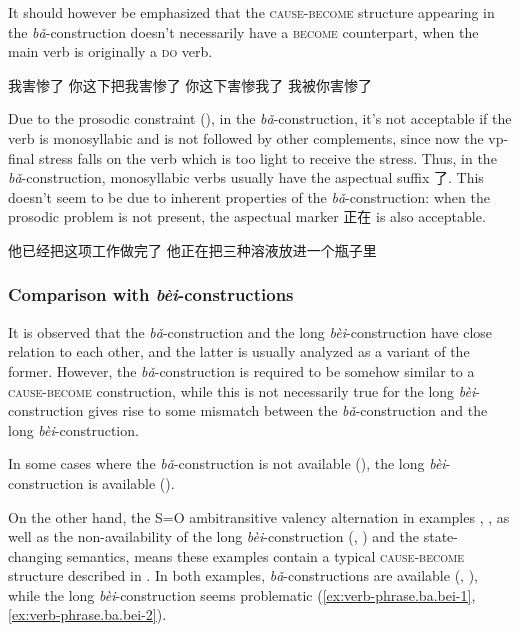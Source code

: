 \documentclass[UTF8, a4paper, oneside, scheme=plain, 12pt]{ctexrep}
\newcommand{\form}[1]{\emph{#1}}
\newcommand*{\category}[1]{\textsc{#1}}
\begin{document}
It should however be emphasized that the \category{cause}-\category{become} structure 
appearing in the \form{bǎ}-construction 
doesn't necessarily have a \category{become} counterpart,
when the main verb is originally a \category{do} verb.

\begin{exe}
    \ex *我害惨了
    \ex 你这下把我害惨了
    \ex 你这下害惨我了
    \ex 我被你害惨了
\end{exe}

Due to the prosodic constraint (), 
in the \form{bǎ}-construction, 
it's not acceptable if the verb is monosyllabic and is not followed by other complements,
since now the \acs{vp}-final stress 
falls on the verb 
which is too light to receive the stress. 
Thus, in the \form{bǎ}-construction, 
monosyllabic verbs usually have the aspectual suffix 了.
This doesn't seem to be due to inherent properties 
of the \form{bǎ}-construction: 
when the prosodic problem is not present, 
the aspectual marker 正在 is also acceptable.

\begin{exe}
    \ex 他已经把这项工作做完了
    \ex 他正在把三种溶液放进一个瓶子里
\end{exe}

\subsubsection{Comparison with \form{bèi}-constructions}

It is observed that the \form{bǎ}-construction
and the long \form{bèi}-construction
have close relation to each other, 
and the latter is usually analyzed 
as a variant of the former.
However, the \form{bǎ}-construction
is required to be somehow similar to a \category{cause}-\category{become} construction,
while this is not necessarily true for the long \form{bèi}-construction
gives rise to some mismatch between the \form{bǎ}-construction
and the long \form{bèi}-construction.

In some cases where the \form{bǎ}-construction is not available 
(),
the long \form{bèi}-construction is available
().

On the other hand,
the S=O ambitransitive valency alternation 
in examples , ,
as well as the non-availability of the long \form{bèi}-construction
(, )
and the state-changing semantics,
means these examples contain a typical \category{cause}-\category{become} structure 
described in .
In both examples, 
\form{bǎ}-constructions are available 
(, ),
while the long \form{bèi}-construction 
seems problematic 
(\ref{ex:verb-phrase.ba.bei-1}, \ref{ex:verb-phrase.ba.bei-2}).
\end{document}
